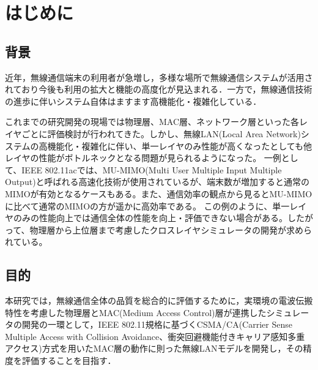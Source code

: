 \documentclass[a4paper,10pt]{ltjsarticle}
\begin{document}

\tableofcontents
\thispagestyle{empty}



\clearpage
\setcounter{page}{1}

\section{はじめに}
\subsection{背景}

近年，無線通信端末の利用者が急増し，多様な場所で無線通信システムが活用されており今後も利用の拡大と機能の高度化が見込まれる．一方で，無線通信技術の進歩に伴いシステム自体はますます高機能化・複雑化している．


これまでの研究開発の現場では物理層、MAC層、ネットワーク層といった各レイヤごとに評価検討が行われてきた。しかし、無線LAN(Local Area Network)システムの高機能化・複雑化に伴い、単一レイヤのみ性能が高くなったとしても他レイヤの性能がボトルネックとなる問題が見られるようになった。
一例として、IEEE 802.11ac\cite{11std}では、MU-MIMO(Multi User Multiple Input Multiple Output)と呼ばれる高速化技術が使用されているが、端末数が増加すると通常のMIMOが有効となるケースもある。また、通信効率の観点から見るとMU-MIMOに比べて通常のMIMOの方が遥かに高効率である。
この例のように、単一レイヤのみの性能向上では通信全体の性能を向上・評価できない場合がある。したがって、物理層から上位層まで考慮したクロスレイヤシミュレータの開発が求められている。

\subsection{目的}

本研究では，無線通信全体の品質を総合的に評価するために，実環境の電波伝搬特性を考慮した物理層とMAC(Medium Access Control)層が連携したシミュレータの開発の一環として，IEEE 802.11規格\cite{11std}に基づくCSMA/CA(Carrier Sense Multiple Access with Collision Avoidance、衝突回避機能付きキャリア感知多重アクセス)方式を用いたMAC層の動作に則った無線LANモデルを開発し，その精度を評価することを目指す．
\end{document}
